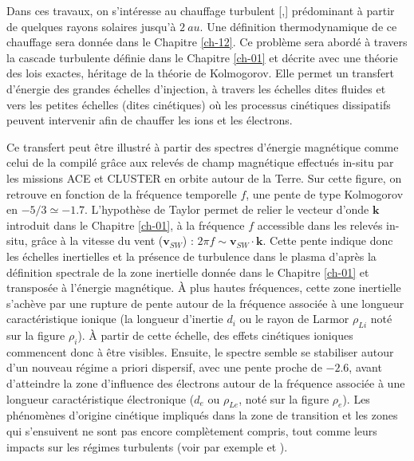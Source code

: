 Dans ces travaux, on s'intéresse au chauffage turbulent [\cite{tu_mhd_1995},\cite{kiyani_dissipation_2015}] prédominant à partir de quelques rayons solaires jusqu'à $\SI{2}{au}$. Une définition thermodynamique de ce chauffage sera donnée dans le Chapitre \ref{ch-12}. Ce problème sera abordé à travers la cascade turbulente définie dans le Chapitre \ref{ch-01} et décrite avec une théorie des lois exactes, héritage de la théorie de Kolmogorov. Elle permet un transfert d'énergie des grandes échelles d'injection, à travers les échelles dites fluides et vers les petites échelles (dites cinétiques) où les processus cinétiques dissipatifs peuvent intervenir afin de chauffer les ions et les électrons. 

Ce transfert peut être illustré à partir des spectres d'énergie magnétique comme celui de la  compilé grâce aux relevés de champ magnétique effectués in-situ par les missions \ac{ACE} et \acs{CLUSTER} en orbite autour de la Terre.  Sur cette figure, on retrouve en fonction de la fréquence temporelle $f$, une pente de type Kolmogorov en $-5/3 \simeq -1.7$. L'hypothèse de Taylor permet de relier le vecteur d'onde $\boldsymbol{k}$ introduit dans le Chapitre \ref{ch-01}, à la fréquence $f$ accessible dans les relevés in-situ, grâce à la vitesse du vent ($\boldsymbol{v}_{SW}$) : $2 \pi f \sim \boldsymbol{v}_{SW} \cdot \boldsymbol{k}$.
Cette pente indique donc les échelles inertielles et la présence de turbulence dans le plasma d'après la définition spectrale de la zone inertielle donnée dans le Chapitre \ref{ch-01} et transposée à l'énergie magnétique. 
À plus hautes fréquences, cette zone inertielle s'achève par une rupture de pente autour de la fréquence associée à une longueur caractéristique ionique (la longueur d'inertie $d_i$ ou le rayon de Larmor $\rho_{Li}$ noté sur la figure $\rho_i$). 
À partir de cette échelle, des effets cinétiques ioniques commencent donc à être visibles. Ensuite, le spectre semble se stabiliser autour d'un nouveau régime a priori dispersif, avec une pente proche de $-2.6$, avant d'atteindre la zone d'influence des électrons autour de la fréquence associée à une longueur caractéristique électronique ($d_e$ ou $\rho_{Le}$, noté sur la figure $\rho_e$). Les phénomènes d'origine cinétique impliqués dans la zone de transition et les zones qui s'ensuivent ne sont pas encore complètement compris, tout comme leurs impacts sur les régimes turbulents (voir par exemple \cite{alexandrova_solar_2013} et \cite{sahraoui_magnetohydrodynamic_2020}). 
